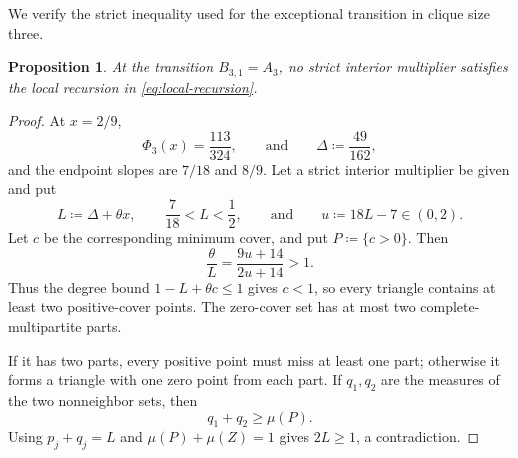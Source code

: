 \documentclass[10pt]{article}
\numberwithin{equation}{section}
\newtheorem{proposition}[proposition]{Proposition}
\begin{document}
We verify the strict inequality used for the exceptional transition in clique size three.

\begin{proposition}\label{prop:r3-transition-estimate}
At the transition $B_{3,1}=A_3$, no strict interior multiplier satisfies the local recursion in \cref{eq:local-recursion}.
\end{proposition}

\begin{proof}
At $x=2/9$,
\[
 \Phi_3(x)=\frac{113}{324},
 \qquad\text{and}\qquad
 \Delta\coloneqq\frac{49}{162},
\]
and the endpoint slopes are $7/18$ and $8/9$.  Let a strict interior multiplier be given and put
\[
 L\coloneqq\Delta+\theta x,
 \qquad
 \frac7{18}<L<\frac12,
 \qquad\text{and}\qquad
 u\coloneqq18L-7\in(0,2).
\]
Let $c$ be the corresponding minimum cover, and put $P\coloneqq\{c>0\}$.
Then
\[
 \frac\theta L=\frac{9u+14}{2u+14}>1.
\]
Thus the degree bound $1-L+\theta c\le1$ gives $c<1$, so every triangle contains at least two positive-cover points.  The zero-cover set has at most two complete-multipartite parts.

If it has two parts, every positive point must miss at least one part; otherwise it forms a triangle with one zero point from each part.  If $q_1,q_2$ are the measures of the two nonneighbor sets, then
\[
 q_1+q_2\ge\mu(P).
\]
Using $p_j+q_j=L$ and $\mu(P)+\mu(Z)=1$ gives $2L\ge1$, a contradiction.


\end{proof}
\end{document}
